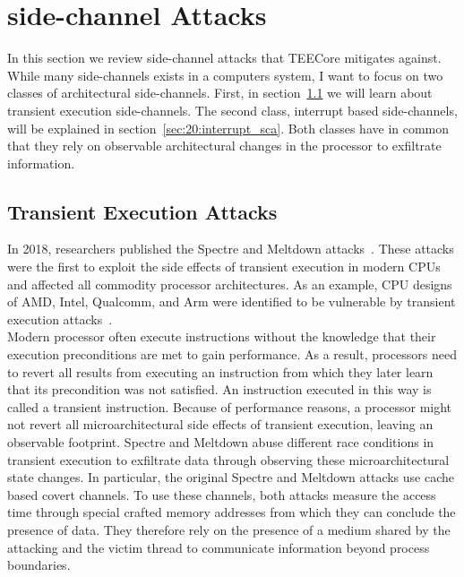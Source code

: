 \section{side-channel Attacks}
\label{sec:20:attacks}
In this section we review side-channel attacks that TEECore mitigates
against. While many side-channels exists in a computers system, I want to focus
on two classes of architectural side-channels. First, in
section~\ref{sec:20:transientattacks} we will learn about transient execution
side-channels. The second class, interrupt based side-channels, will be
explained in section~\ref{sec:20:interrupt_sca}. Both classes have in common
that they rely on observable architectural changes in the processor to
exfiltrate information.

\subsection{Transient Execution Attacks}
\label{sec:20:transientattacks}
In 2018, researchers published the Spectre and Meltdown
attacks~\cite{Kocher2018spectre, lipp_meltdown_2020}. These attacks were the
first to exploit the side effects of transient execution in modern CPUs and
affected all commodity processor architectures. As an example, CPU designs of
AMD, Intel, Qualcomm, and Arm were identified to be vulnerable by transient
execution
attacks~\cite{wikner2022retbleed,moghimi2023downfall,ragab_ghostrace_2024}.\\

Modern processor often execute instructions without the knowledge that their
execution preconditions are met to gain performance. As a result, processors
need to revert all results from executing an instruction from which they later
learn that its precondition was not satisfied. An instruction executed in this
way is called a transient instruction. Because of performance reasons, a
processor might not revert all microarchitectural side effects of transient
execution, leaving an observable footprint. Spectre and Meltdown abuse
different race conditions in transient execution to exfiltrate data through
observing these microarchitectural state changes. In particular, the original
Spectre and Meltdown attacks use cache based covert channels. To use these
channels, both attacks measure the access time through special crafted memory
addresses from which they can conclude the presence of data. They therefore rely
on the presence of a medium shared by the attacking and the victim thread to
communicate information beyond process boundaries. \\

